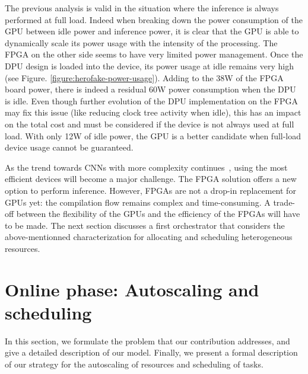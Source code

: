 The previous analysis is valid in the situation where the inference is always performed at full load. Indeed when breaking down the power consumption of the GPU between idle power and inference power, it is clear that the GPU is able to dynamically scale its power usage with the intensity of the processing. The FPGA on the other side seems to have very limited power management. Once the DPU design is loaded into the device, its power usage at idle remains very high (see Figure. \ref{figure:herofake-power-usage}). Adding to the 38W of the FPGA board power, there is indeed a residual 60W power consumption when the DPU is idle. Even though further evolution of the DPU implementation on the FPGA may fix this issue (like reducing clock tree activity when idle), this has an impact on the total cost and must be considered if the device is not always used at full load. With only 12W of idle power, the GPU is a better candidate when full-load device usage cannot be guaranteed.

As the trend towards CNNs with more complexity continues~\cite{8807741}, using the most efficient devices will become a major challenge. The FPGA solution offers a new option to perform inference. However, FPGAs are not a drop-in replacement for GPUs yet: the compilation flow remains complex and time-consuming. A trade-off between the flexibility of the GPUs and the efficiency of the FPGAs will have to be made. The next section discusses a first orchestrator that considers the above-mentionned characterization for allocating and scheduling heterogeneous resources.

\section{Online phase: Autoscaling and scheduling}
\label{online}
In this section, we formulate the problem that our contribution addresses, and give a detailed description of our model. Finally, we present a formal description of our strategy for the autoscaling of resources and scheduling of tasks. 


